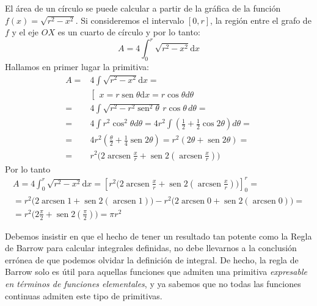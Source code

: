 \begin{ejemplo}\label{ej-circ}
El área de un círculo se puede calcular a partir de la gráfica de la función $f(x)=\sqrt{r^2-x^2}$. Si consideremos el intervalo $[0,r]$, la región entre el grafo de $f$ y el eje $OX$ es un cuarto de círculo y por lo tanto:
\[
A=4\int_0^r\sqrt{r^2-x^2}\mathrm dx
\]
Hallamos en primer lugar la primitiva:
\begin{align*}
A =& 4\int \sqrt{r^2-x^2}\mathrm dx=\\
&\left[
\begin{array}{l}
x=r\operatorname{sen}\theta %
\mathrm dx=r\cos\theta d\theta
\end{array}
\right.\\
=& 4\int \sqrt{r^2-r^2\operatorname{sen}^2\theta}\, r\cos\theta\, d\theta=\\
= & 4\int r^2\cos^2\theta d\theta
= 4r^2\int \left(\frac12+\frac12\cos2\theta\right) d\theta=\\
= & 4r^2\left(\frac{\theta}2+\frac14\operatorname{sen} 2\theta\right)
= r^2\left(2\theta +\operatorname{sen} 2\theta\right)=\\
= & r^2\Big(2\operatorname{arcsen}\frac{x}{r} +\operatorname{sen} 2(\operatorname{arcsen}\frac{x}{r})\Big)
\end{align*}
Por lo tanto
\begin{multline*}
A=4\int_0^r\sqrt{r^2-x^2}\mathrm dx=
\left[r^2\Big(2\operatorname{arcsen}\frac{x}{r} +\operatorname{sen} 2(\operatorname{arcsen}\frac{x}{r})\Big)\right]_0^r=\\
=r^2\Big(2\operatorname{arcsen} 1 +\operatorname{sen} 2(\operatorname{arcsen} 1)\Big)
-r^2\Big(2\operatorname{arcsen} 0 +\operatorname{sen} 2(\operatorname{arcsen} 0)\Big)=\\
=r^2\Big(2\frac{\pi}2 +\operatorname{sen} 2(\frac{\pi}2)\Big)
=\pi r^2\tag*{\fej}
\end{multline*}
\end{ejemplo}

Debemos insistir en que el hecho de tener un resultado tan potente como la Regla de Barrow para calcular integrales definidas, no debe llevarnos a la conclusión errónea de que podemos olvidar la definición de integral.
De hecho, la regla de Barrow solo es útil para aquellas funciones que admiten una primitiva \emph{expresable en términos de funciones elementales}, y ya sabemos que no todas las funciones continuas admiten este tipo de primitivas.

